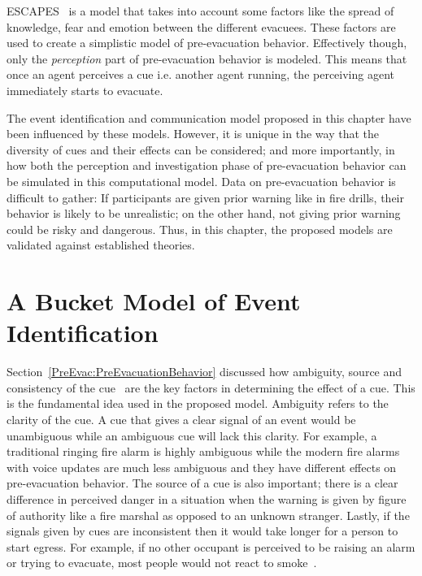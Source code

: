 ESCAPES~\cite{Tsai:2011tz} is a model that takes into account some factors like the spread of knowledge, fear and emotion between the different evacuees. These factors are used to create a simplistic model of pre-evacuation behavior. Effectively though, only the \emph{perception} part of pre-evacuation behavior is modeled. This means that  once an agent perceives a cue i.e. another agent running, the perceiving agent immediately starts to evacuate.

The event identification and communication model proposed in this chapter have been influenced by these models. However, it is unique in the way that the diversity of cues and their effects can be considered; and more importantly, in how both the perception and investigation phase of pre-evacuation behavior can be simulated in this computational model. Data on pre-evacuation behavior is difficult to gather: If participants are given prior warning like in fire drills, their behavior is likely to be unrealistic; on the other hand, not giving prior warning could be risky and dangerous. Thus, in this chapter, the proposed models are validated against established theories.

\section{A Bucket Model of Event Identification}
\label{PreEvac:EventIdentification}

Section~\ref{PreEvac:PreEvacuationBehavior} discussed how ambiguity, source and consistency of the cue~\cite{Kuligowski:2005tt,Sime:1983uy,Tong:1985wn} are the key factors in determining the effect of a cue. This is the fundamental idea used in the proposed model. Ambiguity refers to the clarity of the cue. A cue that gives a clear signal of an event would be unambiguous while an ambiguous cue will lack this clarity. For example, a traditional ringing fire alarm is highly ambiguous while the modern fire alarms with voice updates are much less ambiguous and they have different effects on pre-evacuation behavior. The source of a cue is also important; there is a clear difference in perceived danger in a situation when the warning is given by figure of authority like a fire marshal as opposed to an unknown stranger. Lastly, if the signals given by cues are inconsistent then it would take longer for a person to start egress. For example, if no other occupant is perceived to be raising an alarm or trying to evacuate, most people would not react to smoke~\cite{Latane:1969wm}.

